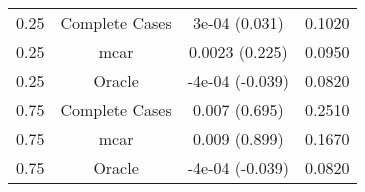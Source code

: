 \begin{table}[ht]
\centering
\begin{tabular}{cccc}
  \hline
  \hline
0.25 & Complete Cases & 3e-04 (0.031) & 0.1020 \\ 
  0.25 & mcar & 0.0023 (0.225) & 0.0950 \\ 
  0.25 & Oracle & -4e-04 (-0.039) & 0.0820 \\ 
  0.75 & Complete Cases & 0.007 (0.695) & 0.2510 \\ 
  0.75 & mcar & 0.009 (0.899) & 0.1670 \\ 
  0.75 & Oracle & -4e-04 (-0.039) & 0.0820 \\ 
   \hline
\end{tabular}
\end{table}
